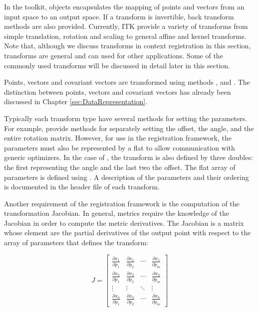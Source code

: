 
\def\tableconfiguration{ | p{4cm} | p{3cm} | p{3cm} | p{4cm} | }


In the toolkit,  objects encapsulates the mapping of
points and vectors from an input space to an output space.
If a transform is invertible, back transform methods are also provided. 
Currently, ITK provide a variety of transforms from simple translation, 
rotation and scaling to general affine and kernel transforms. 
Note that, although we discuss transforms in context registration in this section, 
transforms are general and can used for other applications. Some of the commonly used 
transforms will be discussed in detail later in this section.

Points, vectors and covariant vectors are transformed using methods
,  and .
The distinction between points, vectors and covariant vectors has already
been discussed in Chapter \ref{sec:DataRepresentation}. 

Typically each transform type have several methods for setting
the parameters. For example,  provide methods for
separately setting the offset, the angle, and the entire rotation matrix.
However, for use in the registration framework, the parameters must also
be represented by a flat  to allow communication
with generic optimizers. In the case of , the transform
is also defined by three doubles: the first representing the angle and 
the last two the offset. The flat array of parameters is defined 
using . A description of the parameters and their
ordering is documented in the header file of each transform. 

Another requirement of the registration framework is the computation of the
transformation Jacobian. In general, metrics require the knowledge of 
the Jacobian in order to compute the metric derivatives. 
The Jacobian is a matrix whose element are the partial derivatives of the 
output point with respect to the array of parameters that defines the 
transform:

\begin{equation}
J=\left[ \begin{array}{cccc}
\frac{\partial x_{1}}{\partial p_{1}} & 
\frac{\partial x_{1}}{\partial p_{2}} & 
\cdots  & \frac{\partial x_{1}}{\partial p_{m}}\\
\frac{\partial x_{2}}{\partial p_{1}} & 
\frac{\partial x_{2}}{\partial p_{2}} & 
\cdots  & \frac{\partial x_{2}}{\partial p_{m}}\\
\vdots  & \vdots  & \ddots  & \vdots \\
\frac{\partial x_{n}}{\partial p_{1}} & 
\frac{\partial x_{n}}{\partial p_{2}} & 
\cdots  & \frac{\partial x_{n}}{\partial p_{m}}
\end{array}\right]
\end{equation}

